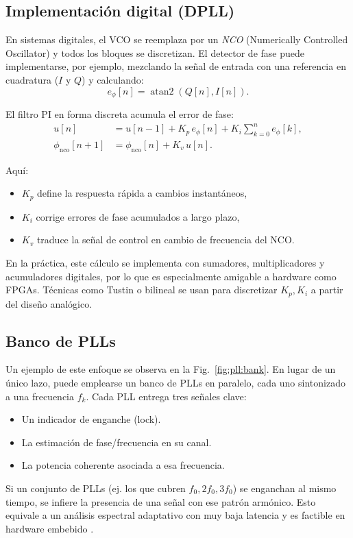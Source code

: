 \subsection{Implementación digital (DPLL)}

En sistemas digitales, el VCO se reemplaza por un \emph{NCO} (Numerically Controlled Oscillator) 
y todos los bloques se discretizan.  
El detector de fase puede implementarse, por ejemplo, mezclando la señal de entrada con una referencia en cuadratura ($I$ y $Q$) y calculando:
\[
e_\phi[n] = \operatorname{atan2}(Q[n], I[n]).
\]

El filtro PI en forma discreta acumula el error de fase:
\begin{align}
	u[n] &= u[n-1] + K_p \, e_\phi[n] + K_i \sum_{k=0}^{n} e_\phi[k], \\
	\phi_{\text{nco}}[n+1] &= \phi_{\text{nco}}[n] + K_v \, u[n].
\end{align}

Aquí:
\begin{itemize}
	\item $K_p$ define la respuesta rápida a cambios instantáneos,  
	\item $K_i$ corrige errores de fase acumulados a largo plazo,  
	\item $K_v$ traduce la señal de control en cambio de frecuencia del NCO.
\end{itemize}

En la práctica, este cálculo se implementa con sumadores, multiplicadores y acumuladores digitales, 
por lo que es especialmente amigable a hardware como FPGAs.  
Técnicas como Tustin o bilineal se usan para discretizar $K_p, K_i$ a partir del diseño analógico.

\subsection{Banco de PLLs}
Un ejemplo de este enfoque se observa en la Fig.~\ref{fig:pll:bank}. 
En lugar de un único lazo, puede emplearse un banco de PLLs en paralelo, cada uno sintonizado a una frecuencia $f_k$.  
Cada PLL entrega tres señales clave:
\begin{itemize}
	\item Un indicador de enganche (lock).  
	\item La estimación de fase/frecuencia en su canal.  
	\item La potencia coherente asociada a esa frecuencia.
\end{itemize}
Si un conjunto de PLLs (ej. los que cubren $f_0, 2f_0, 3f_0$) se enganchan al mismo tiempo, 
se infiere la presencia de una señal con ese patrón armónico.  
Esto equivale a un análisis espectral adaptativo con muy baja latencia y es factible en hardware embebido 
\cite{Han2015}.

